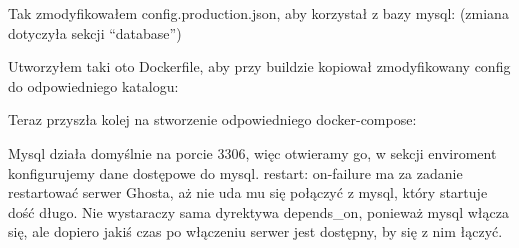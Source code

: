 \documentclass[12pt]{article}
\begin{document}
    Tak zmodyfikowałem config.production.json, aby korzystał z bazy mysql: (zmiana dotyczyła sekcji ``database'')

    

    Utworzyłem taki oto Dockerfile, aby przy buildzie kopiował zmodyfikowany config do odpowiedniego katalogu:

    

    Teraz przyszła kolej na stworzenie odpowiedniego docker-compose:

    

    Mysql działa domyślnie na porcie 3306, więc otwieramy go, w sekcji enviroment konfigurujemy dane dostępowe do mysql. restart: on-failure ma za zadanie restartować serwer Ghosta, aż nie uda mu się połączyć z mysql, który startuje dość długo. Nie wystaraczy sama dyrektywa depends\_on, ponieważ mysql włącza się, ale dopiero jakiś czas po włączeniu serwer jest dostępny, by się z nim łączyć.
\end{document}
